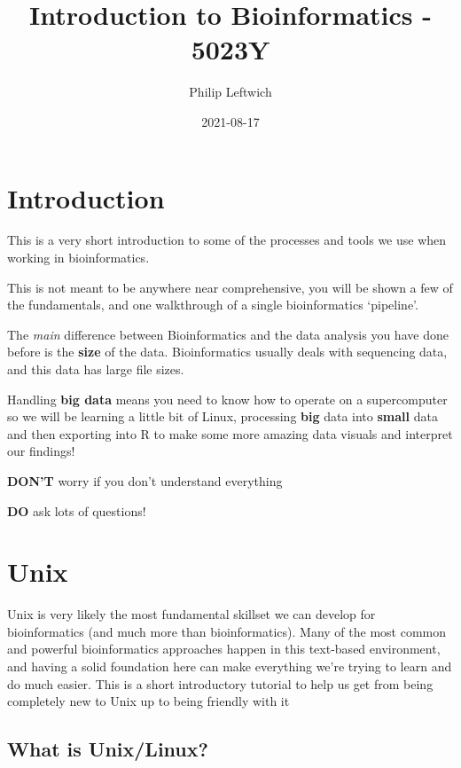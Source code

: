 \documentclass[
]{book}
\title{Introduction to Bioinformatics - 5023Y}
\author{Philip Leftwich}
\date{2021-08-17}
\begin{document}
\maketitle

{
\setcounter{tocdepth}{1}
\tableofcontents
}
\hypertarget{introduction}{%
\chapter{Introduction}\label{introduction}}

This is a very short introduction to some of the processes and tools we use when working in bioinformatics.

This is not meant to be anywhere near comprehensive, you will be shown a few of the fundamentals, and one walkthrough of a single bioinformatics `pipeline'.

The \emph{main} difference between Bioinformatics and the data analysis you have done before is the \textbf{size} of the data. Bioinformatics usually deals with sequencing data, and this data has large file sizes.

Handling \textbf{big data} means you need to know how to operate on a supercomputer so we will be learning a little bit of Linux, processing \textbf{big} data into \textbf{small} data and then exporting into R to make some more amazing data visuals and interpret our findings!

\textbf{DON'T} worry if you don't understand everything

\textbf{DO} ask lots of questions!

\hypertarget{Unix}{%
\chapter{Unix}\label{Unix}}

Unix is very likely the most fundamental skillset we can develop for bioinformatics (and much more than bioinformatics). Many of the most common and powerful bioinformatics approaches happen in this text-based environment, and having a solid foundation here can make everything we're trying to learn and do much easier. This is a short introductory tutorial to help us get from being completely new to Unix up to being friendly with it 🙂

\hypertarget{what-is-unixlinux}{%
\section{What is Unix/Linux?}\label{what-is-unixlinux}}
\end{document}
